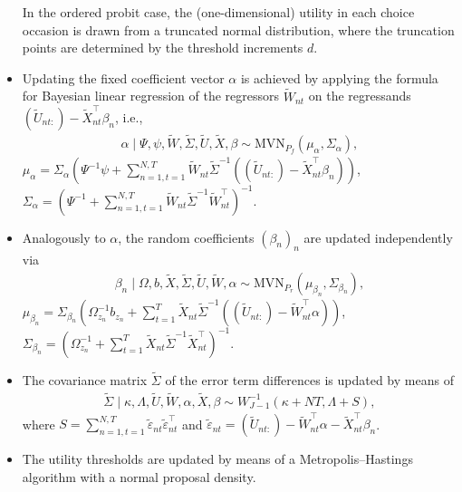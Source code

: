 \documentclass[article,shortnames]{jss}
\begin{document}
\begin{itemize}
  In the ordered probit case, the (one-dimensional) utility in each choice occasion is drawn from a truncated normal distribution, where the truncation points are determined by the threshold increments $d$.
  \item Updating the fixed coefficient vector $\alpha$ is achieved by applying the formula for Bayesian linear regression of the regressors $\tilde{W}_{nt}$ on the regressands $(\tilde{U}_{nt:})-\tilde{X}_{nt}^\top \beta_n$, i.e.,
  \begin{align*}
  \alpha \mid \Psi,\psi,\tilde{W},\tilde{\Sigma},\tilde{U},\tilde{X},\beta \sim \text{MVN}_{P_f}(\mu_\alpha,\Sigma_\alpha),
  \end{align*}
  $\mu_\alpha = \Sigma_\alpha (\Psi^{-1}\psi + \sum_{n=1,t=1}^{N,T} \tilde{W}_{nt} \tilde{\Sigma}^{-1} ((\tilde{U}_{nt:})-\tilde{X}_{nt}^\top \beta_n) )$, $\Sigma_\alpha = (\Psi^{-1} + \sum_{n=1,t=1}^{N,T} \tilde{W}_{nt}\tilde{\Sigma}^{-1} \tilde{W}_{nt}^\top )^{-1}$.
  \item Analogously to $\alpha$, the random coefficients $(\beta_n)_n$ are updated independently via
  \begin{align*}
  \beta_n \mid \Omega,b,\tilde{X},\tilde{\Sigma},\tilde{U},\tilde{W},\alpha \sim \text{MVN}_{P_r}(\mu_{\beta_n},\Sigma_{\beta_n}),
  \end{align*}
  $\mu_{\beta_n} = \Sigma_{\beta_n} (\Omega_{z_n}^{-1}b_{z_n} + \sum_{t=1}^{T} \tilde{X}_{nt} \tilde{\Sigma}^{-1} ((\tilde{U}_{nt:})-\tilde{W}_{nt}^\top \alpha) )$, $\Sigma_{\beta_n} = (\Omega_{z_n}^{-1} + \sum_{t=1}^{T} \tilde{X}_{nt}\tilde{\Sigma}^{-1} \tilde{X}_{nt}^\top )^{-1}$.
    \item The covariance matrix $\tilde{\Sigma}$ of the error term differences is updated by means of
  \begin{align*}
  \tilde{\Sigma} \mid \kappa,\Lambda,\tilde{U},\tilde{W},\alpha,\tilde{X},\beta \sim W^{-1}_{J-1}(\kappa+NT,\Lambda+S),
  \end{align*}
  where $S = \sum_{n=1,t=1}^{N,T} \tilde{\varepsilon}_{nt} \tilde{\varepsilon}_{nt}^\top$ and $\tilde{\varepsilon}_{nt} = (\tilde{U}_{nt:}) - \tilde{W}_{nt}^\top \alpha - \tilde{X}_{nt}^\top \beta_n$.
  \item The utility thresholds  are updated by means of a Metropolis–Hastings algorithm with a normal proposal density.
\end{itemize}
\end{document}
